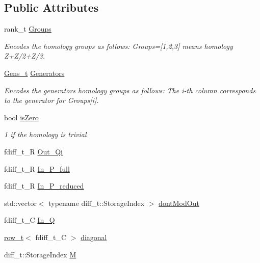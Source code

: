 \subsection*{Public Attributes}
\begin{DoxyCompactItemize}
\item 
rank\+\_\+t \hyperlink{classMackey_1_1Homology_aaae78e6463ce6e60e7f4c5861304bc5b}{Groups}
\begin{DoxyCompactList}\small\item\em Encodes the homology groups as follows\+: Groups=\mbox{[}1,2,3\mbox{]} means homology Z+\+Z/2+\+Z/3. \end{DoxyCompactList}\item 
\hyperlink{classMackey_1_1Homology_a986c3a6644aa52dc8279a26ade42fd64}{Gens\+\_\+t} \hyperlink{classMackey_1_1Homology_abceae7827c633cec7a9892826240c9cd}{Generators}
\begin{DoxyCompactList}\small\item\em Encodes the generators homology groups as follows\+: The i-\/th column corresponds to the generator for Groups\mbox{[}i\mbox{]}. \end{DoxyCompactList}\item 
bool \hyperlink{classMackey_1_1Homology_ae3bb3781bab2b5884295e04a8fddf36e}{is\+Zero}
\begin{DoxyCompactList}\small\item\em 1 if the homology is trivial \end{DoxyCompactList}\item 
fdiff\+\_\+t\+\_\+R \hyperlink{classMackey_1_1Homology_a49fa2fbf9542e38b4000f4889f633f62}{Out\+\_\+\+Qi}
\item 
fdiff\+\_\+t\+\_\+R \hyperlink{classMackey_1_1Homology_ad2f8d8e87b9ee4f6c2db72558ab8b2a8}{In\+\_\+\+P\+\_\+full}
\item 
fdiff\+\_\+t\+\_\+R \hyperlink{classMackey_1_1Homology_ae00a8d4ac6bdfd2de79045576200c6d2}{In\+\_\+\+P\+\_\+reduced}
\item 
std\+::vector$<$ typename diff\+\_\+t\+::\+Storage\+Index $>$ \hyperlink{classMackey_1_1Homology_a12fe9d461d594721ad6985629e3f50f2}{dont\+Mod\+Out}
\item 
fdiff\+\_\+t\+\_\+C \hyperlink{classMackey_1_1Homology_a451ad6ea31ffe0ed18111f102ec2e370}{In\+\_\+Q}
\item 
\hyperlink{namespaceMackey_a6d37801553e585770ca7d1243ab3b213}{row\+\_\+t}$<$ fdiff\+\_\+t\+\_\+C $>$ \hyperlink{classMackey_1_1Homology_acff409513ea412c16b84f304d097059b}{diagonal}
\item 
diff\+\_\+t\+::\+Storage\+Index \hyperlink{classMackey_1_1Homology_a904d8b7e452d276930b19e592fe3cda5}{M}
\end{DoxyCompactItemize}
